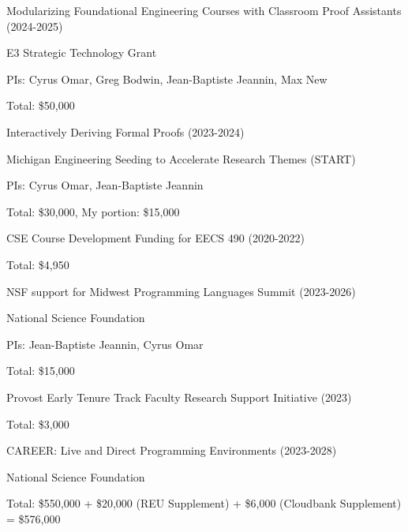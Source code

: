 \documentclass[10pt,letterpaper]{article}
\renewenvironment{itemize}{
  \begin{list}{}{
    \setlength{\leftmargin}{1.25em}
    \setlength{\itemsep}{0.25em}
    \setlength{\parskip}{0pt}
    \setlength{\parsep}{0.2em}
  }
}{
  \end{list}
}
\begin{document}
\begin{itemize}
  \item Modularizing Foundational Engineering Courses with Classroom Proof Assistants (2024-2025)
    \begin{itemize}
      \item E3 Strategic Technology Grant
      \item PIs: Cyrus Omar, Greg Bodwin, Jean-Baptiste Jeannin, Max New
      \item Total: \$50,000
    \end{itemize}
  \item Interactively Deriving Formal Proofs (2023-2024)
        \begin{itemize}
          \item Michigan Engineering Seeding to Accelerate Research Themes (START)
          \item PIs: Cyrus Omar, Jean-Baptiste Jeannin
          \item Total: \$30,000, My portion: \$15,000
        \end{itemize}
  \item CSE Course Development Funding for EECS 490 (2020-2022)
        \begin{itemize}
          \item Total: \$4,950
        \end{itemize}
  \item NSF support for Midwest Programming Languages Summit (2023-2026)
        \begin{itemize}
          \item National Science Foundation
          \item PIs: Jean-Baptiste Jeannin, Cyrus Omar
          \item Total: \$15,000
        \end{itemize}
  \item Provost Early Tenure Track Faculty Research Support Initiative (2023)
        \begin{itemize}
          \item Total: \$3,000
        \end{itemize}
  \item CAREER: Live and Direct Programming Environments (2023-2028)
        \begin{itemize}
          \item National Science Foundation 
          \item Total: \$550,000 + \$20,000 (REU Supplement) + \$6,000 (Cloudbank Supplement) = \$576,000
        \end{itemize}

\end{itemize}
\end{document}
